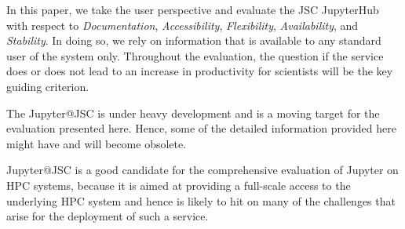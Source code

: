 In this paper, we take the user perspective and evaluate the JSC JupyterHub with respect to {\em Documentation}, {\em Accessibility}, {\em Flexibility}, {\em Availability}, and {\em Stability}.
In doing so, we rely on information that is available to any standard user of the system only.
Throughout the evaluation, the question if the service does or does not lead to an increase in productivity for scientists will be the key guiding criterion.

The Jupyter@JSC is under heavy development and is a moving target for the evaluation presented here.
Hence, some of the detailed information provided here might have and will become obsolete.

Jupyter@JSC is a good candidate for the comprehensive evaluation of Jupyter on HPC systems, because it is aimed at providing a full-scale access to the underlying HPC system and hence is likely to hit on many of the challenges that arise for the deployment of such a service. 
